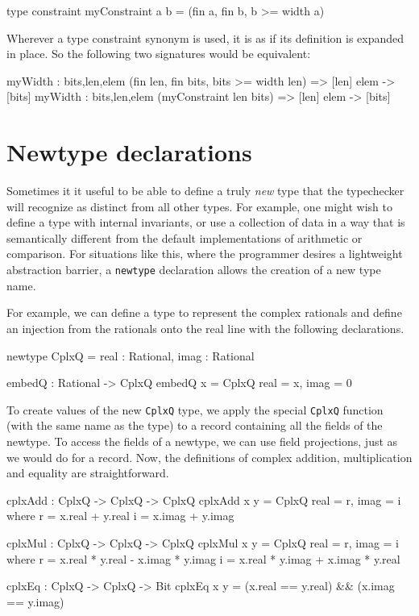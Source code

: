 \begin{code}
  type constraint myConstraint a b = (fin a, fin b, b >= width a)
\end{code}

Wherever a type constraint synonym is used, it is as if its definition
is expanded in place. So the following two signatures would be
equivalent:

\begin{code}
    myWidth : {bits,len,elem} (fin len, fin bits, bits >= width len) => [len] elem -> [bits]
    myWidth : {bits,len,elem} (myConstraint len bits) => [len] elem -> [bits]
\end{code}

\section{Newtype declarations}

Sometimes it it useful to be able to define a truly \emph{new} type
that the typechecker will recognize as distinct from all other types.
For example, one might wish to define a type with internal invariants,
or use a collection of data in a way that is semantically different from
the default implementations of arithmetic or comparison.  For
situations like this, where the programmer desires a lightweight
abstraction barrier, a \texttt{newtype} declaration allows the
creation of a new type name.

For example, we can define a type to represent the complex rationals
and define an injection from the rationals onto the real line with the
following declarations.

\begin{code}
  newtype CplxQ = { real : Rational, imag : Rational }

  embedQ : Rational -> CplxQ
  embedQ x = CplxQ { real = x, imag = 0 }
\end{code}

To create values of the new \texttt{CplxQ} type, we apply the special
\texttt{CplxQ} function (with the same name as the type) to a record
containing all the fields of the newtype.  To access the fields of a
newtype, we can use field projections, just as we would do for a
record.  Now, the definitions of complex addition, multiplication and
equality are straightforward.

\begin{code}
  cplxAdd : CplxQ -> CplxQ -> CplxQ
  cplxAdd x y = CplxQ { real = r, imag = i }
    where
      r = x.real + y.real
      i = x.imag + y.imag

  cplxMul : CplxQ -> CplxQ -> CplxQ
  cplxMul x y = CplxQ { real = r, imag = i }
    where
      r = x.real * y.real - x.imag * y.imag
      i = x.real * y.imag + x.imag * y.real

  cplxEq : CplxQ -> CplxQ -> Bit
  cplxEq x y = (x.real == y.real) && (x.imag == y.imag)

\end{code}

